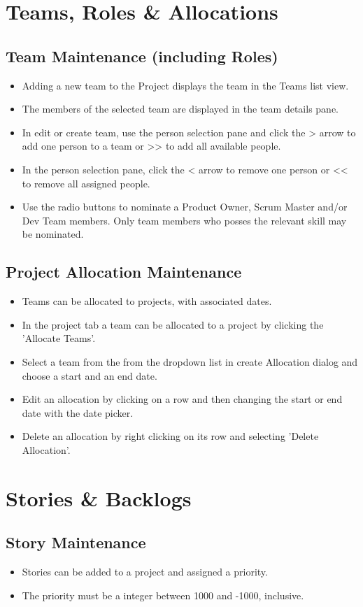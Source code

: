 \documentclass[11pt,fleqn]{book} %
\begin{document}
\section{Teams, Roles \& Allocations}
\subsection{Team Maintenance (including Roles)}
\begin{itemize}
  \item Adding a new team to the Project displays the team in the Teams list view.
  \item The members of the selected team are displayed in the team details pane.
  \item In edit or create team, use the person selection pane and click the > arrow to add one person to a team
  or >> to add all available people.
  \item In the person selection pane, click the < arrow to remove one person or << to remove all assigned people.
  \item Use the radio buttons to nominate a Product Owner, Scrum Master and/or Dev Team members. Only team members who
   posses the relevant skill may be nominated.
\end{itemize}

\subsection{Project Allocation Maintenance}
\begin{itemize}
  \item Teams can be allocated to projects, with associated dates.
  \item In the project tab a team can be allocated to a project by clicking the 'Allocate Teams'.
  \item Select a team from the from the dropdown list in create Allocation dialog and choose a start and an end date.
  \item Edit an allocation by clicking on a row and then changing the start or end date with the date picker.
  \item Delete an allocation by right clicking on its row and selecting 'Delete Allocation'.
\end{itemize}
\section{Stories \& Backlogs}

\subsection{Story Maintenance}
\begin{itemize}
  \item Stories can be added to a project and assigned a priority.
  \item The priority must be a integer between 1000 and -1000, inclusive.
\end{itemize}
\end{document}
